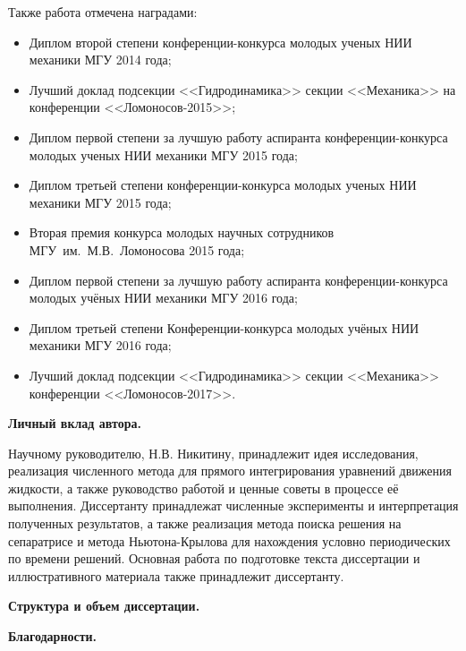 Также работа отмечена наградами:
\begin{itemize}
\item Диплом второй степени конференции-конкурса молодых ученых НИИ механики МГУ 2014 года;
\item Лучший доклад подсекции <<Гидродинамика>> секции <<Механика>> на конференции <<Ломоносов-2015>>;
\item Диплом первой степени за лучшую работу аспиранта конференции-конкурса молодых ученых НИИ механики МГУ 2015 года;
\item Диплом третьей степени конференции-конкурса молодых ученых НИИ механики МГУ 2015 года;
\item Вторая премия конкурса молодых научных сотрудников МГУ~им.~М.В.~Ломоносова 2015 года;
\item Диплом первой степени за лучшую работу аспиранта конференции-конкурса молодых учёных НИИ механики МГУ 2016 года;
\item Диплом третьей степени Конференции-конкурса молодых учёных НИИ механики МГУ 2016 года;
\item Лучший доклад подсекции <<Гидродинамика>> секции <<Механика>> конференции <<Ломоносов-2017>>.
\end{itemize}


{\bf Личный вклад автора.}

Научному руководителю, Н.В. Никитину, принадлежит идея исследования, реализация численного метода для прямого интегрирования уравнений движения жидкости, а также руководство работой и ценные советы в процессе её выполнения. Диссертанту принадлежат численные эксперименты и интерпретация полученных результатов, а также реализация метода поиска решения на сепаратрисе и метода Ньютона-Крылова для нахождения условно периодических по времени решений. Основная работа по подготовке текста диссертации и иллюстративного материала также принадлежит диссертанту.


{\bf Структура и объем диссертации.}

{\bf Благодарности.}


